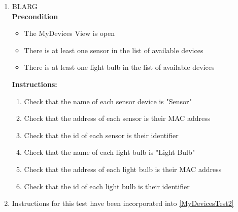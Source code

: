 \documentclass[a4paper]{article}
\newlength{\testlabellength}
\newenvironment{testlist}{\begin{enumerate}[label=\bfseries Instruction \thesubsection.\arabic* , labelindent=0pt, labelwidth=\testlabellength , leftmargin=2cm]}{\end{enumerate}}
\newenvironment{precondition}{
{\color{white}BLARG}\\ 
\textbf{Precondition}
\begin{itemize}[labelindent=0cm, labelwidth=2cm , leftmargin=1cm]
}
{\end{itemize}}
\newenvironment{instruction}{
\textbf{Instructions:}
\begin{enumerate}[label=\bfseries  \arabic*., labelindent=0cm, labelwidth=2cm , leftmargin=1cm]
}
{\end{enumerate}}
\newenvironment{postcondition}{
\textbf{Postcondition:}
\begin{itemize}[labelindent=0cm, labelwidth=2cm , leftmargin=1cm]
}
{\end{itemize}}
\begin{document}
\begin{appendices}
\begin{testlist}
   
	\item \label{MyDevicesTest2}
		\begin{precondition}
			\item The MyDevices View is open
			\item There is at least one sensor in the list of available devices
			\item There is at least one light bulb in the list of available devices
		\end{precondition}
			
		\begin{instruction}
			\item Check that the name of each sensor device is "Sensor"
			\item Check that the address of each sensor is their MAC address
			\item Check that the id of each sensor is their identifier
			\item Check that the name of each light bulb is "Light Bulb"
			\item Check that the address of each light bulb is their MAC address
			\item Check that the id of each light bulb is their identifier
		\end{instruction}
		   

	\item
		Instructions for this test have been incorporated into \ref{MyDevicesTest2}
   
		   

\end{testlist}
\end{appendices}
\end{document}
